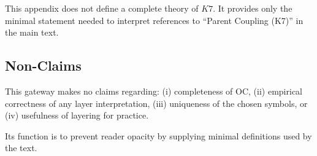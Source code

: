 This appendix does not define a complete theory of $K7$.
It provides only the minimal statement needed to interpret references to
``Parent Coupling (K7)'' in the main text.

\subsection*{Non-Claims}

This gateway makes no claims regarding:
(i) completeness of OC,
(ii) empirical correctness of any layer interpretation,
(iii) uniqueness of the chosen symbols, or
(iv) usefulness of layering for practice.

Its function is to prevent reader opacity by supplying minimal
definitions used by the text.

